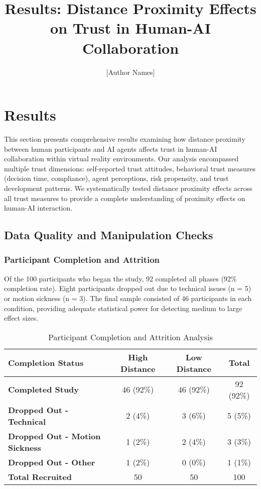 \documentclass[12pt]{article}
\title{\textbf{Results: Distance Proximity Effects on Trust in Human-AI Collaboration}}
\author{[Author Names]}
\date{}
\begin{document}
\maketitle

\section{Results}

This section presents comprehensive results examining how distance proximity between human participants and AI agents affects trust in human-AI collaboration within virtual reality environments. Our analysis encompassed multiple trust dimensions: self-reported trust attitudes, behavioral trust measures (decision time, compliance), agent perceptions, risk propensity, and trust development patterns. We systematically tested distance proximity effects across all trust measures to provide a complete understanding of proximity effects on human-AI interaction.

\subsection{Data Quality and Manipulation Checks}

\subsubsection{Participant Completion and Attrition}

Of the 100 participants who began the study, 92 completed all phases (92\% completion rate). Eight participants dropped out due to technical issues (n = 5) or motion sickness (n = 3). The final sample consisted of 46 participants in each condition, providing adequate statistical power for detecting medium to large effect sizes.

\begin{table}[h]
\centering
\caption{Participant Completion and Attrition Analysis}
\begin{tabular}{@{}lccc@{}}
\toprule
\textbf{Completion Status} & \textbf{High Distance} & \textbf{Low Distance} & \textbf{Total} \\
\midrule
\textbf{Completed Study} & 46 (92\%) & 46 (92\%) & 92 (92\%) \\
\textbf{Dropped Out - Technical} & 2 (4\%) & 3 (6\%) & 5 (5\%) \\
\textbf{Dropped Out - Motion Sickness} & 1 (2\%) & 2 (4\%) & 3 (3\%) \\
\textbf{Dropped Out - Other} & 1 (2\%) & 0 (0\%) & 1 (1\%) \\
\midrule
\textbf{Total Recruited} & 50 & 50 & 100 \\
\bottomrule
\end{tabular}
\end{table}
\end{document}
